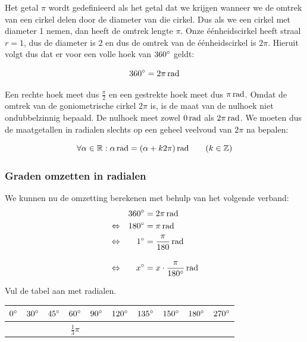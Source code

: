\documentclass[a4paper,12pt,twoside]{article}
\begin{document}
Het getal $\pi$ wordt gedefinieerd als het getal dat we krijgen wanneer we de omtrek van een cirkel delen door de diameter van die cirkel. Dus als we een cirkel met diameter 1 nemen, dan heeft de omtrek lengte $\pi$. Onze éénheidscirkel heeft straal $r=1$, dus de diameter is $2$ en dus de omtrek van de éénheidscirkel is $2\pi$. Hieruit volgt dus dat er voor een volle hoek van $360^\circ$ geldt:

\begin{mdframed}
$$360\degree = 2\pi \rad$$
\end{mdframed}

Een rechte hoek meet dus $\frac{\pi}{2}$ en een gestrekte hoek meet dus $\pi \rad$. Omdat de omtrek van de goniometrische cirkel $2\pi$ is, is de maat van de nulhoek niet ondubbelzinnig bepaald. De nulhoek meet zowel $0 \rad$ als $2\pi \rad$. We moeten dus de maatgetallen in radialen slechts op een geheel veelvoud van $2\pi$ na bepalen:

\begin{mdframed}
$$\forall \alpha \in \mathbb{R} : \alpha \rad = (\alpha + k2\pi) \rad \qquad (k\in \mathbb{Z})$$
\end{mdframed}

\subsubsection*{Graden omzetten in radialen}
We kunnen nu de omzetting berekenen met behulp van het volgende verband:
\begin{alignat*}{2}
     &&360\degree &= 2\pi \rad\\
\LRA &&180\degree &= \pi \rad\\
\LRA &&  1\degree &= \frac{\pi}{180} \rad\\[1em]
\LRA &&  x\degree &= x\cdot\frac{\pi}{180\degree} \rad
\end{alignat*}

\begin{oefening}
Vul de tabel aan met radialen.
\begin{center}
  \begin{tabular}{c|c|c|c|c|c|c|c|c|c}
    $0^\circ$ & $30^\circ$ & $45^\circ$ & $60^\circ$ &$90^\circ$ &$120^\circ$ &$135^\circ$ &$150^\circ$ &$180^\circ$ & $270^\circ$ \\
    \hline
   &&&$\frac{1}{3}\pi$&&&&&&\\
  \end{tabular}
\end{center}
\end{oefening}
\end{document}
